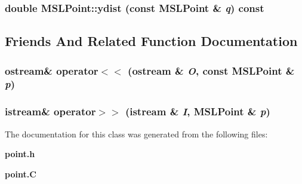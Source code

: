 \subsubsection{\setlength{\rightskip}{0pt plus 5cm}double MSLPoint::ydist (const MSLPoint \& {\em q}) const}\label{classMSLPoint_a9}




\subsection{Friends And Related Function Documentation}
\subsubsection{\setlength{\rightskip}{0pt plus 5cm}ostream\& operator$<$$<$ (ostream \& {\em O}, const MSLPoint \& {\em p})\hspace{0.3cm}{\tt  [friend]}}\label{classMSLPoint_l0}


\subsubsection{\setlength{\rightskip}{0pt plus 5cm}istream\& operator$>$$>$ (istream \& {\em I}, MSLPoint \& {\em p})\hspace{0.3cm}{\tt  [friend]}}\label{classMSLPoint_l1}




The documentation for this class was generated from the following files:\begin{CompactItemize}
\item 
{\bf point.h}\item 
{\bf point.C}\end{CompactItemize}
